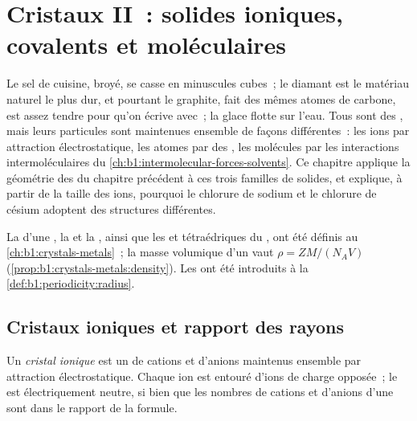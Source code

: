 \chapter{Cristaux II~: solides ioniques, covalents et moléculaires}\label{ch:b1:crystals-ionic-covalent}

Le sel de cuisine, broyé, se casse en minuscules cubes~; le diamant est
le matériau naturel le plus dur, et pourtant le graphite, fait des mêmes
atomes de carbone, est assez tendre pour qu'on écrive avec~; la glace
flotte sur l'eau. Tous sont des , mais leurs particules sont
maintenues ensemble de façons différentes~: les ions par attraction
électrostatique, les atomes par des , les molécules
par les interactions intermoléculaires du
\cref{ch:b1:intermolecular-forces-solvents}. Ce chapitre applique la
géométrie des  du chapitre précédent à ces trois familles de
solides, et explique, à partir de la taille des ions, pourquoi le
chlorure de sodium et le chlorure de césium adoptent des structures
différentes.

\begin{recall}
La  d'une , la  et la , ainsi que
les  et tétraédriques du  , ont été définis au \cref{ch:b1:crystals-metals}~; la masse
volumique d'un  vaut $\rho = ZM/(N_A V)$
(\cref{prop:b1:crystals-metals:density}). Les  ont été
introduits à la \cref{def:b1:periodicity:radius}.
\end{recall}

\section{Cristaux ioniques et rapport des rayons}

\begin{definition}\label{def:b1:crystals-ionic-covalent:ionic-crystal}
Un \emph{cristal ionique} est un  de
cations et d'anions maintenus ensemble par attraction électrostatique.
Chaque ion est entouré d'ions de charge opposée~; le  est
électriquement neutre, si bien que les nombres de cations et d'anions
d'une  sont dans le rapport de la formule.
\end{definition}

